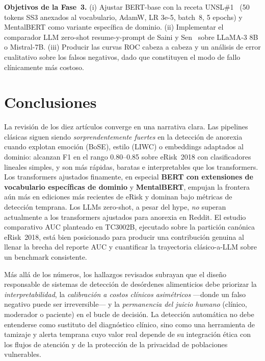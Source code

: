 \documentclass[journal]{IEEEtran}
\begin{document}
\textbf{Objetivos de la Fase~3.} (i) Ajustar BERT-base con la receta UNSL\#1~\cite{thompson2024timeaware} (50 tokens SS3 anexados al vocabulario, AdamW, LR 3e-5, batch~8, 5 epochs) y MentalBERT como variante específica de dominio. (ii) Implementar el comparador LLM zero-shot resume-y-prompt de Saini y Sen~\cite{saini2026patchtst} sobre LLaMA-3 8B o Mistral-7B. (iii) Producir las curvas ROC cabeza a cabeza y un análisis de error cualitativo sobre los falsos negativos, dado que constituyen el modo de fallo clínicamente más costoso.

\section{Conclusiones}

La revisión de los diez artículos converge en una narrativa clara. Las pipelines clásicas siguen siendo \emph{sorprendentemente fuertes} en la detección de anorexia cuando explotan emoción (BoSE), estilo (LIWC) o embeddings adaptados al dominio: alcanzan F1 en el rango 0.80--0.85 sobre eRisk~2018 con clasificadores lineales simples, y son más rápidas, baratas e interpretables que los transformers. Los transformers ajustados finamente, en especial \textbf{BERT con extensiones de vocabulario específicas de dominio} y \textbf{MentalBERT}, empujan la frontera aún más en ediciones más recientes de eRisk y dominan bajo métricas de detección temprana. Los LLMs zero-shot, a pesar del hype, \emph{no} superan actualmente a los transformers ajustados para anorexia en Reddit. El estudio comparativo AUC planteado en TC3002B, ejecutado sobre la partición canónica eRisk~2018, está bien posicionado para producir una contribución genuina al llenar la brecha del reporte AUC y cuantificar la trayectoria clásico-a-LLM sobre un benchmark consistente.

Más allá de los números, los hallazgos revisados subrayan que el diseño responsable de sistemas de detección de desórdenes alimenticios debe priorizar la \emph{interpretabilidad}, la \emph{calibración a costos clínicos asimétricos} ---donde un falso negativo puede ser irreversible--- y la \emph{permanencia del juicio humano} (clínico, moderador o paciente) en el bucle de decisión. La detección automática no debe entenderse como sustituto del diagnóstico clínico, sino como una herramienta de tamizaje y alerta temprana cuyo valor real depende de su integración ética con los flujos de atención y de la protección de la privacidad de poblaciones vulnerables.
\end{document}
